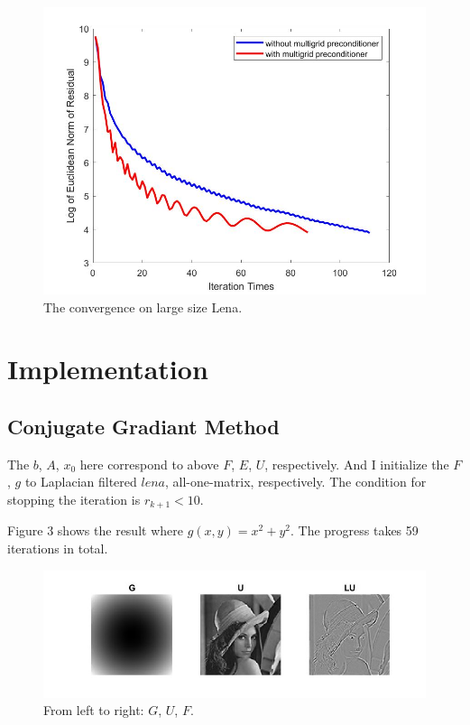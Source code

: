 \documentclass{article}
\begin{document}
\begin{figure}[H]
   \centering
   \includegraphics[scale=0.3]{figure/convergence_lenal.jpg}
   \caption{The convergence on large size Lena.}
\end{figure}

\section{Implementation}
\subsection{Conjugate Gradiant Method}
The $b$, $A$, $x_0$ here correspond to above $F$, $E$, $U$, respectively. And I initialize the $F$, $ g$ to Laplacian filtered $\textit{lena}$, all-one-matrix, respectively. The condition for stopping the iteration is $r_{k+1}<10$.

Figure 3 shows the result where $g(x,y)=x^2+y^2$. The progress takes 59 iterations in total.
\begin{figure}[H]
   \centering
   \includegraphics[scale=0.8]{figure/cg.jpg}
   \caption{From left to right: $G$, $U$, $F$.}
\end{figure}
\end{document}
